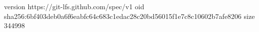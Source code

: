version https://git-lfs.github.com/spec/v1
oid sha256:6bf403deb0a6f6eabfc64c683c1edac28c20bd56015f1e7c8c10602b7afe8206
size 344998
